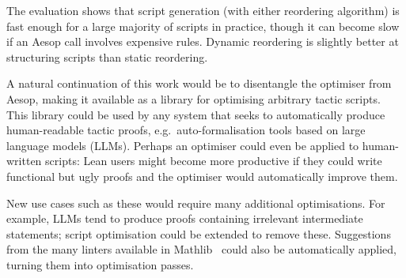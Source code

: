 The evaluation shows that script generation (with either reordering algorithm) is fast enough for a large majority of scripts in practice, though it can become slow if an Aesop call involves expensive rules.
Dynamic reordering is slightly better at structuring scripts than static reordering.

A natural continuation of this work would be to disentangle the optimiser from Aesop, making it available as a library for optimising arbitrary tactic scripts.
This library could be used by any system that seeks to automatically produce human-readable tactic proofs, e.g.\ auto-formalisation tools based on large language models (LLMs).
Perhaps an optimiser could even be applied to human-written scripts: Lean users might become more productive if they could write functional but ugly proofs and the optimiser would automatically improve them.

New use cases such as these would require many additional optimisations.
For example, LLMs tend to produce proofs containing irrelevant intermediate statements; script optimisation could be extended to remove these.
Suggestions from the many linters available in Mathlib~\cite{vanDoorn2020} could also be automatically applied, turning them into optimisation passes.
